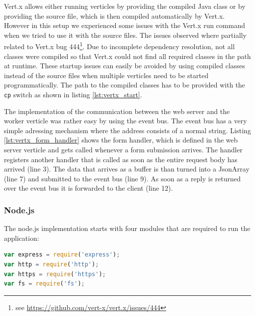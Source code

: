 

Vert.x allows either running verticles by providing the compiled Java class or by providing the
source file, which is then compiled automatically by Vert.x. However in this
setup we experienced some issues with the Vert.x run command when we tried to
use it with the source files. The issues observed where partially related to
Vert.x bug 444\footnote{see \url{https://github.com/vert-x/vert.x/issues/444}}.
Due to incomplete dependency resolution, not all classes were compiled so that
Vert.x could not find all required classes in the path at runtime.
These startup issues can easily be avoided by using compiled classes instead of
the source files when multiple verticles need to be started programmatically.
The path to the compiled classes has to be provided with the \texttt{cp} switch as
shown in listing \ref{lst:vertx_start}.





The implementation of the communication between the web server and the worker
verticle was rather easy by using the event bus. The event bus has a very
simple adressing mechanism where the address consists of a normal string.
Listing \ref{lst:vertx_form_handler} shows the form handler, which is defined
in the web server verticle and gets called whenever a form submission arrives.
The handler registers another handler that is called as soon as the entire
request body has arrived (line 3). The data that arrives as a buffer is than
turned into a JsonArray (line 7) and submitted to the event bus (line 9).
As soon as a reply is returned over the event bus it is forwarded to the client (line 12).



\subsubsection{Node.js}
\label{implementation_node}
The node.js implementation starts with four modules that are required to run the application:

\begin{lstlisting}[language=javascript,caption={Including modules},label=lst:includenodemodules]
var express = require('express');
var http = require('http');
var https = require('https');
var fs = require('fs');
\end{lstlisting}

